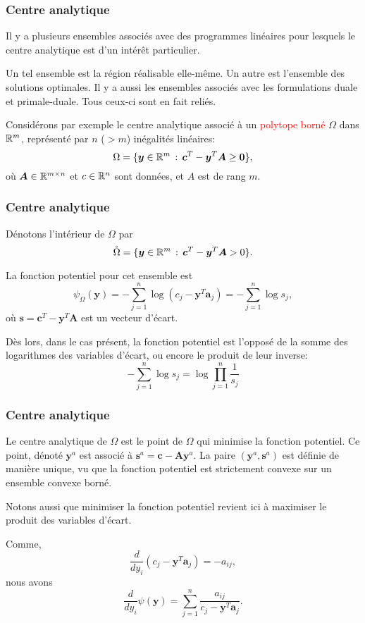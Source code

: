 \documentclass[usepdftitle=false, aspectratio=169]{beamer}
\def\ba{\boldsymbol{a}}
\def\bc{\boldsymbol{c}}
\def\bs{\boldsymbol{s}}
\def\by{\boldsymbol{y}}
\def\bA{\boldsymbol{A}}
\def\bzero{\boldsymbol{0}}
\begin{document}
\begin{frame}
\frametitle{Centre analytique}

Il y a plusieurs ensembles associés avec des programmes linéaires pour lesquels le centre analytique est d'un intérêt particulier.

\mbox{}

Un tel ensemble est la région réalisable elle-même. Un autre est l'ensemble des solutions optimales. Il y a aussi les ensembles associés avec les formulations duale et primale-duale. Tous ceux-ci sont en fait reliés.

\mbox{}

Considérons par exemple le centre analytique associé à un \textcolor{red}{polytope borné} $\Omega$ dans ${\mathbb{R}}^m$, représenté par $n$ ($> m$) inégalités linéaires:
\[
\Omega = \lbrace \by \in \RR^m \,:\, \bc^T - \by^T \bA \geq \bzero \rbrace,
\]
où $\bA \in \RR^{m \times n}$ et $c \in {\mathbb{R}}^n$ sont données, et $A$ est de rang $m$.

\end{frame}

\begin{frame}
\frametitle{Centre analytique}

Dénotons l'intérieur de $\Omega$ par
\[
\mathring{\Omega} = \lbrace \by \in \RR^m \,:\, \bc^T - \by^T\bA > 0 \rbrace.
\]

\mbox{}

La fonction potentiel pour cet ensemble est
\[
\psi_{\Omega} (\by) = - \sum_{j = 1}^n \log (c_j - \by^T\ba_j) = -\sum_{j = 1}^n \log s_j,
\]
où $\bs = \bc^T - \by^T\bA$ est un vecteur d'écart.

\mbox{}

Dès lors, dans le cas présent, la fonction potentiel est l'opposé de la somme des logarithmes des variables d'écart, ou encore le produit de leur inverse:
$$
-\sum_{j = 1}^n \log s_j = \log \prod_{j = 1}^n \frac{1}{s_j}
$$

\end{frame}

\begin{frame}
\frametitle{Centre analytique}

Le centre analytique de $\Omega$ est le point de $\Omega$ qui minimise la fonction potentiel. Ce point, dénoté $\by^a$ est associé à $\bs^a = \bc - \bA\by^a$. La paire $(\by^a, \bs^a)$ est définie de manière unique, vu que la fonction potentiel est strictement convexe sur un ensemble convexe borné.

\mbox{}

Notons aussi que minimiser la fonction potentiel revient ici à maximiser le produit des variables d'écart.

\mbox{}

Comme,
$$
\frac{d}{dy_i} (c_j-\by^T\ba_j) = -a_{ij},
$$
nous avons
$$
\frac{d}{dy_i} \psi(\by) = \sum_{j = 1}^n \frac{a_{ij}}{c_j - \by^T\ba_j}.
$$

\end{frame}
\end{document}
